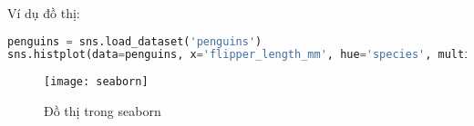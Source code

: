 \documentclass[../main-report.tex]{subfiles}
\begin{document}
\begin{example}
Ví dụ đồ thị:
\begin{lstlisting}[language=Python]
penguins = sns.load_dataset('penguins')
sns.histplot(data=penguins, x='flipper_length_mm', hue='species', multiple='stack')
\end{lstlisting}
\begin{figure}[ht!]
\centering\texttt{[image: seaborn]}
\caption{Đồ thị trong seaborn}
\label{fig:seaborn}
\end{figure}
\end{example}
\end{document}
